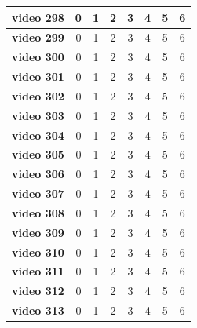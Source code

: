 \begin{table}[]
\begin{tabular}{c|c|c|c|c|c|c|c|}
\multicolumn{1}{|c|}{\textbf{video 298}} & 0 & 1 & 2 & 3 & 4 & 5 & 6 \\ \hline
\multicolumn{1}{|c|}{\textbf{video 299}} & 0 & 1 & 2 & 3 & 4 & 5 & 6 \\ \hline
\multicolumn{1}{|c|}{\textbf{video 300}} & 0 & 1 & 2 & 3 & 4 & 5 & 6 \\ \hline
\multicolumn{1}{|c|}{\textbf{video 301}} & 0 & 1 & 2 & 3 & 4 & 5 & 6 \\ \hline
\multicolumn{1}{|c|}{\textbf{video 302}} & 0 & 1 & 2 & 3 & 4 & 5 & 6 \\ \hline
\multicolumn{1}{|c|}{\textbf{video 303}} & 0 & 1 & 2 & 3 & 4 & 5 & 6 \\ \hline
\multicolumn{1}{|c|}{\textbf{video 304}} & 0 & 1 & 2 & 3 & 4 & 5 & 6 \\ \hline
\multicolumn{1}{|c|}{\textbf{video 305}} & 0 & 1 & 2 & 3 & 4 & 5 & 6 \\ \hline
\multicolumn{1}{|c|}{\textbf{video 306}} & 0 & 1 & 2 & 3 & 4 & 5 & 6 \\ \hline
\multicolumn{1}{|c|}{\textbf{video 307}} & 0 & 1 & 2 & 3 & 4 & 5 & 6 \\ \hline
\multicolumn{1}{|c|}{\textbf{video 308}} & 0 & 1 & 2 & 3 & 4 & 5 & 6 \\ \hline
\multicolumn{1}{|c|}{\textbf{video 309}} & 0 & 1 & 2 & 3 & 4 & 5 & 6 \\ \hline
\multicolumn{1}{|c|}{\textbf{video 310}} & 0 & 1 & 2 & 3 & 4 & 5 & 6 \\ \hline
\multicolumn{1}{|c|}{\textbf{video 311}} & 0 & 1 & 2 & 3 & 4 & 5 & 6 \\ \hline
\multicolumn{1}{|c|}{\textbf{video 312}} & 0 & 1 & 2 & 3 & 4 & 5 & 6 \\ \hline
\multicolumn{1}{|c|}{\textbf{video 313}} & 0 & 1 & 2 & 3 & 4 & 5 & 6 \\ \hline
\end{tabular}
\end{table}

